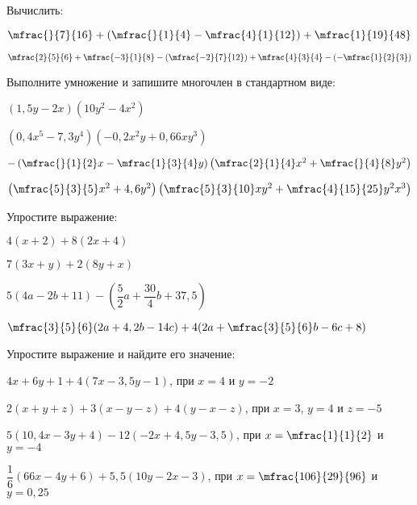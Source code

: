 %
%
\begin{homework}[number=2]
	\begin{listofex}
	\item Вычислить:
		\begin{enumcols}[itemcolumns=2]
			\item \( \mfrac{}{7}{16}+\left( \mfrac{}{1}{4}-\mfrac{4}{1}{12} \right)+\mfrac{1}{19}{48} \)
			\item \( \mfrac{2}{5}{6}+\mfrac{-3}{1}{8}-\left( \mfrac{-2}{7}{12} \right)+\mfrac{4}{3}{4}-\left( -\mfrac{1}{2}{3} \right) \)
		\end{enumcols}
	\item Выполните умножение и запишите многочлен в стандартном виде:
	\begin{enumcols}[itemcolumns=2]
		\item \( (1,5y-2x)(10y^2-4x^2) \)
		\item \( (0,4x^5-7,3y^4)(-0,2x^2y+0,66xy^3) \)
		\item \( -\left( \mfrac{}{1}{2}x-\mfrac{1}{3}{4}y \right)\left( \mfrac{2}{1}{4}x^2+\mfrac{}{4}{8}y^2 \right) \)
		\item \( \left( \mfrac{5}{3}{5}x^2+4,6y^2 \right)\left( \mfrac{5}{3}{10}xy^2+\mfrac{4}{15}{25}y^2x^3 \right) \)
	\end{enumcols}
	\item Упростите выражение:
	\begin{enumcols}[itemcolumns=2]
		\item \( 4(x+2)+8(2x+4) \)
		\item \( 7(3x+y)+2(8y+x) \)
		\item \( 5(4a-2b+11)-\left( \dfrac{5}{2}a+\dfrac{30}{4}b+37,5 \right) \)
		\item \( \mfrac{3}{5}{6}(2a+4,2b-14c)+4(2a+\mfrac{3}{5}{6}b-6c+8) \)
	\end{enumcols}
	\item Упростите выражение и найдите его значение:
	\begin{enumcols}
		\item \( 4x+6y+1+4(7x-3,5y-1) \), при \( x=4 \) и \( y=-2 \)
		\item \( 2(x+y+z)+3(x-y-z)+4(y-x-z) \), при \( x=3 \), \( y=4 \) и \( z=-5 \)
		\item \( 5(10,4x-3y+4)-12(-2x+4,5y-3,5) \), при \( x=\mfrac{1}{1}{2} \) и \( y=-4 \)
		\item \( \dfrac{1}{6}(66x-4y+6)+5,5(10y-2x-3) \), при \( x=\mfrac{106}{29}{96} \) и \( y=0,25 \)
	\end{enumcols}

\end{listofex}
\end{homework}
